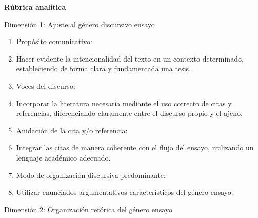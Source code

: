 \documentclass[spanish]{textolivre}
\begin{document}
\vspace{\baselineskip}

\noindent \textbf{Rúbrica analítica}

\noindent Dimensión 1: Ajuste al género discursivo ensayo

\begin{enumerate}[label=\arabic*.\arabic*, leftmargin=*]
    \item[1.1] Propósito comunicativo:
    \item[] Hacer evidente la intencionalidad del texto en un contexto determinado, estableciendo de forma clara y fundamentada una tesis.
    
    \item[1.2] Voces del discurso:
    \item[] Incorporar la literatura necesaria mediante el uso correcto de citas y referencias, diferenciando claramente entre el discurso propio y el ajeno.
    
    \item[1.3] Anidación de la cita y/o referencia:
    \item[] Integrar las citas de manera coherente con el flujo del ensayo, utilizando un lenguaje académico adecuado.
    
    \item[1.4] Modo de organización discursiva predominante:
    \item[] Utilizar enunciados argumentativos característicos del género ensayo.
\end{enumerate}

\medskip

\noindent Dimensión 2: Organización retórica del género ensayo
\end{document}
